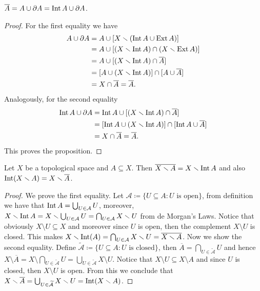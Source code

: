 \begin{proposition}
\label{prop:closure-composition}
\(\overline A = A \cup \partial A = \operatorname{Int} A \cup \partial A\).
\end{proposition}

\begin{proof}
For the first equality we have
\begin{align*}
  A \cup \partial A
  &= A \cup [X \smallsetminus (\operatorname{Int} A \cup \operatorname{Ext} A)] \\
  &= A \cup [(X \smallsetminus \operatorname{Int} A) \cap (X \smallsetminus \operatorname{Ext} A)] \\
  &= A \cup [(X \smallsetminus \operatorname{Int} A) \cap \overline{A}] \\
  &= [A \cup (X \smallsetminus \operatorname{Int} A)] \cap [A \cup \overline{A}] \\
  &= X \cap \overline{A} = \overline{A}.
\end{align*}
Analogously, for the second equality
\begin{align*}
  \operatorname{Int} A \cup \partial A
  &= \operatorname{Int} A \cup [(X \smallsetminus \operatorname{Int} A) \cap \overline A] \\
  &= [\operatorname{Int} A \cup (X \smallsetminus \operatorname{Int} A)] \cap [\operatorname{Int} A \cup \overline A] \\
  &= X \cap \overline A = \overline A.
\end{align*}
This proves the proposition.
\end{proof}

\begin{proposition}
Let \(X\) be a topological space and \(A \subseteq X\). Then \(\overline{X
\smallsetminus A} = X \smallsetminus \operatorname{Int} A\) and also \(\operatorname{Int}(X \smallsetminus A) =
X \smallsetminus \overline A\).
\end{proposition}

\begin{proof}
We prove the first equality. Let \(\mathcal A \coloneq \{U \subseteq A \colon U \text{ is
open}\}\), from definition we have that \(\operatorname{Int} A = \bigcup_{U \in \mathcal A}
U\), moreover, \(X \smallsetminus \operatorname{Int} A = X \smallsetminus \bigcup_{U \in \mathcal A} U
= \bigcap_{U \in \mathcal A} X \smallsetminus U\) from de Morgan's Laws. Notice that
obviously \(X \setminus U \subseteq X\) and moreover since \(U\) is open, then
the complement \(X \setminus U\) is closed. This makes \(X \smallsetminus \operatorname{Int}(A) =
\bigcap_{U \in \mathcal A} X \smallsetminus U = \overline{X \smallsetminus A}\). Now we
show the second equality. Define \(\mathcal{\widetilde A} \coloneq \{U \subseteq A \colon U
\text{ is closed}\}\), then \(\overline A = \bigcap_{U \in \mathcal{\widetilde
A}} U\) and hence \(X \setminus \overline A = X \setminus \bigcap_{U \in
\mathcal{\widetilde A}} U = \bigcup_{U \in \widetilde{\mathcal{A}}} X \setminus
U\). Notice that \(X\setminus U \subseteq X \setminus A\) and since \(U\) is
closed, then \(X \setminus U\) is open. From this we conclude that \(X \smallsetminus
\overline A = \bigcup_{U \in \mathcal{\widetilde A}} X \smallsetminus U = \operatorname{Int}(X
\smallsetminus A)\).
\end{proof}

